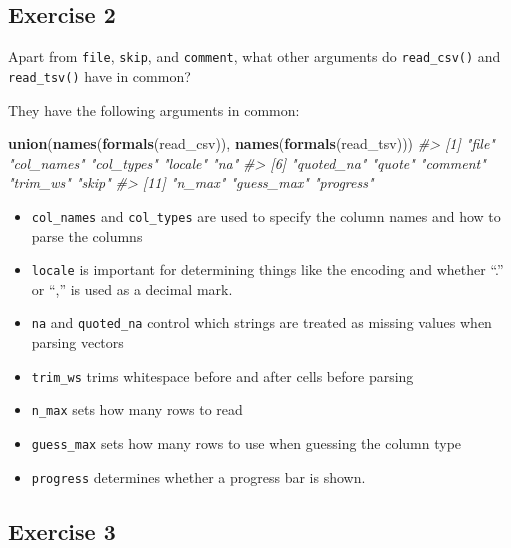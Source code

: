 \documentclass[]{book}
\newenvironment{Shaded}{\begin{snugshade}}{\end{snugshade}}
\newcommand{\CommentTok}[1]{\textcolor[rgb]{0.56,0.35,0.01}{\textit{#1}}}
\newcommand{\KeywordTok}[1]{\textcolor[rgb]{0.13,0.29,0.53}{\textbf{#1}}}
\newcommand{\NormalTok}[1]{#1}
\providecommand{\tightlist}{%
  \setlength{\itemsep}{0pt}\setlength{\parskip}{0pt}}
\theoremstyle{definition}
\theoremstyle{definition}
\theoremstyle{definition}
\theoremstyle{remark}
\begin{document}
\hypertarget{exercise-2-13}{%
\subsection{Exercise 2}\label{exercise-2-13}}

Apart from \texttt{file}, \texttt{skip}, and \texttt{comment}, what
other arguments do \texttt{read\_csv()} and \texttt{read\_tsv()} have in
common?

They have the following arguments in common:

\begin{Shaded}
\begin{Highlighting}[]
\KeywordTok{union}\NormalTok{(}\KeywordTok{names}\NormalTok{(}\KeywordTok{formals}\NormalTok{(read_csv)), }\KeywordTok{names}\NormalTok{(}\KeywordTok{formals}\NormalTok{(read_tsv)))}
\CommentTok{#>  [1] "file"      "col_names" "col_types" "locale"    "na"       }
\CommentTok{#>  [6] "quoted_na" "quote"     "comment"   "trim_ws"   "skip"     }
\CommentTok{#> [11] "n_max"     "guess_max" "progress"}
\end{Highlighting}
\end{Shaded}

\begin{itemize}
\tightlist
\item
  \texttt{col\_names} and \texttt{col\_types} are used to specify the
  column names and how to parse the columns
\item
  \texttt{locale} is important for determining things like the encoding
  and whether ``.'' or ``,'' is used as a decimal mark.
\item
  \texttt{na} and \texttt{quoted\_na} control which strings are treated
  as missing values when parsing vectors
\item
  \texttt{trim\_ws} trims whitespace before and after cells before
  parsing
\item
  \texttt{n\_max} sets how many rows to read
\item
  \texttt{guess\_max} sets how many rows to use when guessing the column
  type
\item
  \texttt{progress} determines whether a progress bar is shown.
\end{itemize}

\hypertarget{exercise-3-11}{%
\subsection{Exercise 3}\label{exercise-3-11}}
\end{document}
